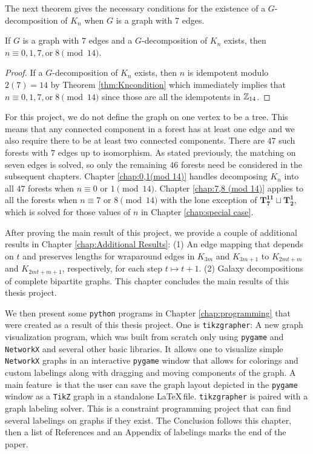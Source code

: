 The next theorem gives the necessary conditions for the existence of a $G$-decomposition of $K_n$ when $G$ is a graph with 7 edges.

\begin{thm}\label{thm:forestcondition}

  If $G$ is a graph with $7$ edges and a $G$-decomposition of $K_n$ exists, then $n \equiv 0,1,7, \textrm{or} \; 8 \pmod{14}$.

\end{thm}
\begin{proof}
    If a $G$-decomposition of $K_{n}$ exists, then $n$ is idempotent modulo $2(7)=14$ by Theorem \ref{thm:Kncondition} which immediately implies that $n \equiv 0,1,7, \textrm{or} \; 8 \pmod{14}$ since those are all the idempotents in $\mathbb{Z}_{14}$.
\end{proof}

For this project, we do not define the graph on one vertex to be a tree. This means that any connected component in a forest has at least one edge and we also require there to be at least two connected components. There are $47$ such forests with $7$ edges up to isomorphism.  As stated previously, the matching on seven edges is solved, so only the remaining $46$ forests need be considered in the subsequent chapters. Chapter \ref{chap:0,1(mod 14)} handles decomposing $K_{n}$ into all $47$ forests when $n \equiv 0 \textrm{ or } 1 \pmod{14}$. Chapter \ref{chap:7,8 (mod 14)} applies to all the forests when $n \equiv 7 \textrm{ or } 8 \pmod{14}$ with the lone exception of $\mathbf{T_{7}^{11}}\sqcup\mathbf{T_{2}^{1}},$ which is solved for those values of $n$ in Chapter \ref{chap:special case}.

After proving the main result of this project, we provide a couple of additional results in Chapter \ref{chap:Additional Results}: (1) An edge mapping that depends on $t$ and preserves lengths for wraparound edges in $K_{3m}$ and $K_{3m+1}$ to $K_{2mt+m}$ and $K_{2mt+m+1}$, respectively, for each step $t\mapsto t+1$. (2) Galaxy decompositions of complete bipartite graphs. This chapter concludes the main results of this thesis project.

We then present some \verb|python| programs in Chapter \ref{chap:programming} that were created as a result of this thesis project. One is \verb|tikzgrapher|: A new graph visualization program, which was built from scratch only using \verb|pygame| and \verb|NetworkX| and several other basic libraries. It allows one to visualize simple \verb|NetworkX| graphs in an interactive \verb|pygame| window that allows for colorings and custom labelings along with dragging and moving components of the graph. A main feature\ is that the user can save the graph layout depicted in the \verb|pygame| window as a \verb|TikZ| graph in a standalone \LaTeX$\,$file. \verb|tikzgrapher| is paired with a graph labeling solver. This is a constraint programming project that can find several labelings on graphs if they exist. The Conclusion follows this chapter, then a list of References and an Appendix of labelings marks the end of the paper.




